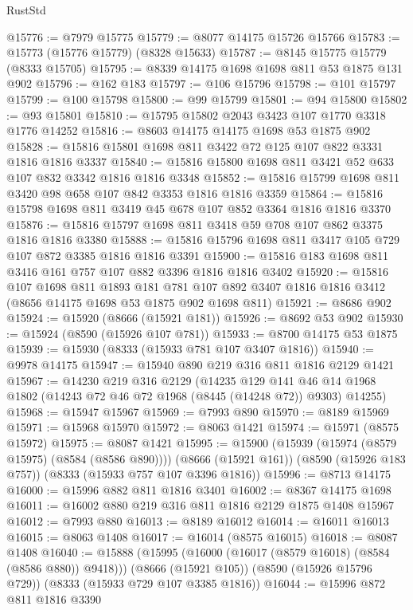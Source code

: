 \begin{lexlean}{RustStd}
\begin{coremodule}
@15776 := @7979 @15775
@15779 := @8077 @14175 @15726 @15766
@15783 := @15773 (@15776 @15779) (@8328 @15633)
@15787 := @8145 @15775 @15779 (@8333 @15705)
@15795 := @8339 @14175 @1698 @1698 @811 @53 @1875 @131 @902
@15796 := @162 @183
@15797 := @106 @15796
@15798 := @101 @15797
@15799 := @100 @15798
@15800 := @99 @15799
@15801 := @94 @15800
@15802 := @93 @15801
@15810 := @15795 @15802 @2043 @3423 @107 @1770 @3318 @1776 @14252
@15816 := @8603 @14175 @14175 @1698 @53 @1875 @902
@15828 := @15816 @15801 @1698 @811 @3422 @72 @125 @107 @822 @3331 @1816 @1816 @3337
@15840 := @15816 @15800 @1698 @811 @3421 @52 @633 @107 @832 @3342 @1816 @1816 @3348
@15852 := @15816 @15799 @1698 @811 @3420 @98 @658 @107 @842 @3353 @1816 @1816 @3359
@15864 := @15816 @15798 @1698 @811 @3419 @45 @678 @107 @852 @3364 @1816 @1816 @3370
@15876 := @15816 @15797 @1698 @811 @3418 @59 @708 @107 @862 @3375 @1816 @1816 @3380
@15888 := @15816 @15796 @1698 @811 @3417 @105 @729 @107 @872 @3385 @1816 @1816 @3391
@15900 := @15816 @183 @1698 @811 @3416 @161 @757 @107 @882 @3396 @1816 @1816 @3402
@15920 := @15816
    @107
    @1698
    @811
    @1893
    @181
    @781
    @107
    @892
    @3407
    @1816
    @1816
    @3412
    (@8656 @14175 @1698 @53 @1875 @902 @1698 @811)
@15921 := @8686 @902
@15924 := @15920 (@8666 (@15921 @181))
@15926 := @8692 @53 @902
@15930 := @15924 (@8590 (@15926 @107 @781))
@15933 := @8700 @14175 @53 @1875
@15939 := @15930 (@8333 (@15933 @781 @107 @3407 @1816))
@15940 := @9978 @14175
@15947 := @15940 @890 @219 @316 @811 @1816 @2129 @1421
@15967 := @14230
    @219
    @316
    @2129
    (@14235
      @129
      @141
      @46
      @14
      @1968
      @1802
      (@14243 @72 @46 @72 @1968 (@8445 (@14248 @72)) @9303)
      @14255)
@15968 := @15947 @15967
@15969 := @7993 @890
@15970 := @8189 @15969
@15971 := @15968 @15970
@15972 := @8063 @1421
@15974 := @15971 (@8575 @15972)
@15975 := @8087 @1421
@15995 := @15900
    (@15939 (@15974 (@8579 @15975) (@8584 (@8586 @890))))
    (@8666 (@15921 @161))
    (@8590 (@15926 @183 @757))
    (@8333 (@15933 @757 @107 @3396 @1816))
@15996 := @8713 @14175
@16000 := @15996 @882 @811 @1816 @3401
@16002 := @8367 @14175 @1698
@16011 := @16002 @880 @219 @316 @811 @1816 @2129 @1875 @1408 @15967
@16012 := @7993 @880
@16013 := @8189 @16012
@16014 := @16011 @16013
@16015 := @8063 @1408
@16017 := @16014 (@8575 @16015)
@16018 := @8087 @1408
@16040 := @15888
    (@15995 (@16000 (@16017 (@8579 @16018) (@8584 (@8586 @880)) @9418)))
    (@8666 (@15921 @105))
    (@8590 (@15926 @15796 @729))
    (@8333 (@15933 @729 @107 @3385 @1816))
@16044 := @15996 @872 @811 @1816 @3390

\end{coremodule}
\end{lexlean}
